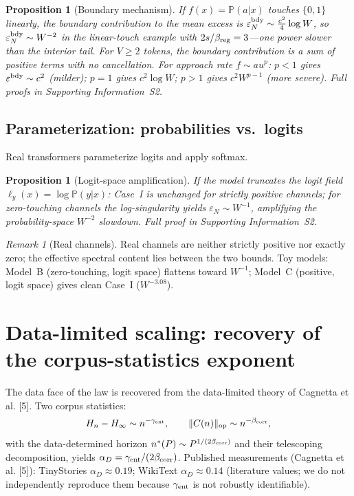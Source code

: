 \documentclass[12pt]{article}
\newcommand{\eps}{\varepsilon}
\newcommand{\Prob}{\mathbb{P}}
\newtheorem{proposition}[theorem]{Proposition}
\theoremstyle{remark}
\newtheorem{remark}{Remark}
\begin{document}
\begin{proposition}[Boundary mechanism]
\label{prop:boundary}
If $f(x)=\Prob(a|x)$ touches $\{0,1\}$ linearly, the boundary contribution to
the mean excess is $\eps_N^{\rm bdy}\sim\frac{c^2}{4}\log W$, so
$\eps_N^{\rm bdy}\sim W^{-2}$ in the linear-touch example with
$2s/\beta_{\rm reg}=3$---one power \emph{slower} than the interior tail.
For $V\!\ge\!2$ tokens, the boundary contribution is a sum of positive terms
with no cancellation.
For approach rate $f\sim au^p$: $p<1$ gives $\eps^{\rm bdy}\sim c^2$ (milder);
$p=1$ gives $c^2\log W$; $p>1$ gives $c^2 W^{p-1}$ (more severe).
Full proofs in Supporting Information~S2.
\end{proposition}

\subsection{Parameterization: probabilities vs.\ logits}
Real transformers parameterize logits and apply softmax.

\begin{proposition}[Logit-space amplification]
\label{prop:logit}
If the model truncates the logit field $\ell_y(x)=\log\Prob(y|x)$:
Case~I is unchanged for strictly positive channels; for zero-touching
channels the log-singularity yields $\eps_N\sim W^{-1}$, amplifying the
probability-space $W^{-2}$ slowdown.
Full proof in Supporting Information~S2.
\end{proposition}

\begin{remark}[Real channels]
\label{rem:logit}
Real channels are neither strictly positive nor exactly zero; the effective
spectral content lies between the two bounds.  Toy models: Model~B
(zero-touching, logit space) flattens toward $W^{-1}$; Model~C (positive, logit
space) gives clean Case~I ($W^{-3.08}$).
\end{remark}

\section{Data-limited scaling: recovery of the corpus-statistics exponent}
\label{sec:data}

The data face of the law is recovered from the data-limited theory of
Cagnetta et al. [5].  Two corpus statistics:
\begin{equation}
  H_n - H_\infty \sim n^{-\gamma_{\rm ent}},
  \qquad
  \|C(n)\|_{\rm op}\sim n^{-\beta_{\rm corr}},
  \label{eq:entropy}
\end{equation}
with the data-determined horizon $n^*(P)\sim P^{1/(2\beta_{\rm corr})}$ and
their telescoping decomposition, yields
$\alpha_D=\gamma_{\rm ent}/(2\beta_{\rm corr})$.
Published measurements (Cagnetta et al. [5]): TinyStories
$\alpha_D\!\approx\!0.19$; WikiText $\alpha_D\!\approx\!0.14$ (literature
values; we do not independently reproduce them because $\gamma_{\rm ent}$ is
not robustly identifiable).
\end{document}
